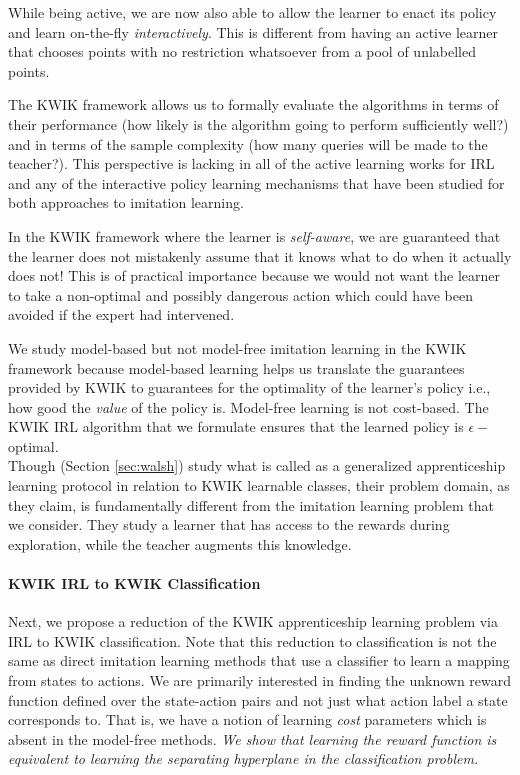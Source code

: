 While being active, we are now also able to allow the learner to enact its policy and learn on-the-fly \textit{interactively}. This is different from having an active learner that chooses points with no restriction whatsoever from a pool of unlabelled points. 

The KWIK framework allows us to formally evaluate the algorithms in terms of their performance (how likely is the algorithm going to perform sufficiently well?) and in terms of the sample complexity (how many queries will be made to the teacher?). This perspective is lacking in all of the active learning works for IRL and any of the interactive policy learning mechanisms that have been studied for both approaches to imitation learning.

 In the KWIK framework where the learner is \textit{self-aware}, we are guaranteed that the learner does not mistakenly assume that it knows what to do when it actually does not! This is of practical importance because we would not want the learner to take a non-optimal and possibly dangerous action which could have been avoided if the expert had intervened.

 We study model-based but not model-free imitation learning in the KWIK framework because model-based learning helps us translate the guarantees provided by KWIK to guarantees for the optimality of the learner's policy i.e., how good the \textit{value} of the policy is. Model-free learning is not cost-based. The KWIK IRL algorithm that we formulate ensures that the learned policy is $\epsilon-$optimal. \\
 

Though \citet{DBLP:conf/icml/WalshSLD10} (Section \ref{sec:walsh}) study what is called as a generalized apprenticeship learning protocol in relation to KWIK learnable classes, their problem domain, as they claim, is fundamentally different from the imitation learning problem that we consider. They study a learner that has access to the rewards during exploration, while the teacher augments this knowledge.  

\paragraph{KWIK IRL to KWIK Classification}

Next, we propose a reduction of the KWIK apprenticeship learning problem via IRL to KWIK  classification. Note that this reduction to classification is not the same as direct imitation learning methods that use a classifier to learn a mapping from states to actions. We are primarily interested in finding the unknown reward function defined over the state-action pairs and not just what action label a state corresponds to. That is, we have a notion of learning \textit{cost} parameters which is absent in the model-free methods. \textit{We show that learning the reward function is equivalent to learning the separating hyperplane in the classification problem. 
}

